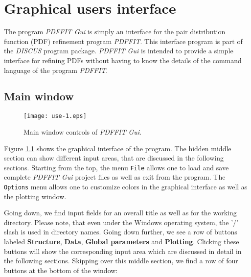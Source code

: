 
\chapter{Graphical users interface \label{gui}}

The program {\it PDFFIT Gui} is simply an interface for the pair
distribution function (PDF) refinement program {\it PDFFIT}. This
interface program is part of the {\it DISCUS} program package. {\it
PDFFIT Gui} is intended to provide a simple interface for refining
PDFs without having to know the details of the command language of
the program {\it PDFFIT}. \par

\section{Main window}

\begin{figure}[!b]
   \centering
   \texttt{[image: use-1.eps]}
   \caption{Main window controls of {\it PDFFIT Gui}.}
   \label{fig_use1}
\end{figure}

Figure \ref{fig_use1} shows the graphical interface of the program.
The hidden middle section can show different input areas, that are
discussed in the following sections. Starting from the top, the menu
{\tt File} allows one to load and save complete {\it PDFFIT Gui}
project files as well as exit from the program. The {\tt Options}
menu allows one to customize colors in the graphical interface as
well as the plotting window. \par

Going down, we find input fields for an overall title as well as for
the working directory. Please note, that even under the Windows
operating system, the '/' slash is used in directory names. Going
down further, we see a row of buttons labeled \textbf{Structure},
\textbf{Data}, \textbf{Global parameters} and \textbf{Plotting}.
Clicking these buttons will show the corresponding input area which
are discussed in detail in the following sections. Skipping over
this middle section, we find a row of four buttons at the bottom of
the window:

